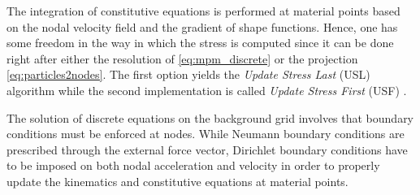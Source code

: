The integration of constitutive equations is performed at material points based on the nodal velocity field and the gradient of shape functions. Hence, one has some freedom in the way in which the stress is computed since it can be done right after either the resolution of \eqref{eq:mpm_discrete} or the projection \eqref{eq:particles2nodes}. The first option yields the \textit{Update Stress Last} (USL) algorithm while the second implementation is called \textit{Update Stress First} (USF) \cite{Bardenhagen_USF_USL}. 

The solution of discrete equations on the background grid involves that boundary conditions must be enforced at nodes. While Neumann boundary conditions are prescribed through the external force vector, Dirichlet boundary conditions have to be imposed on both nodal acceleration and velocity in order to properly update the kinematics and constitutive equations at material points.  

